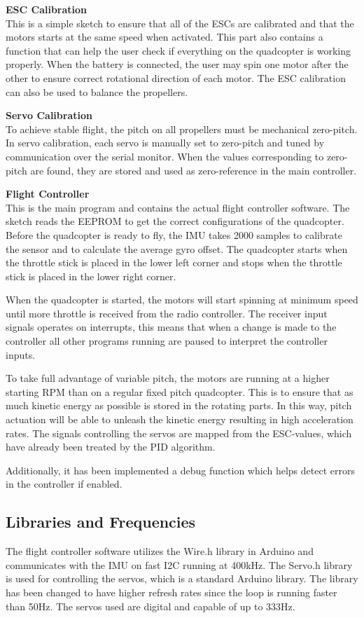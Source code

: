 \textbf{ESC Calibration}\\
This is a simple sketch to ensure that all of the ESCs are calibrated and that the motors starts at the same speed when activated. This part also contains a function that can help the user check if everything on the quadcopter is working properly. When the battery is connected, the user may spin one motor after the other to ensure correct rotational direction of each motor. The ESC calibration can also be used to balance the propellers.  \bigskip

\textbf{Servo Calibration}\\
To achieve stable flight, the pitch on all propellers must be mechanical zero-pitch. In servo calibration, each servo is manually set to zero-pitch and tuned by communication over the serial monitor. When the values corresponding to zero-pitch are found, they are stored and used as zero-reference in the main controller. \bigskip

\textbf{Flight Controller}\\
This is the main program and contains the actual flight controller software. The sketch reads the EEPROM to get the correct configurations of the quadcopter. Before the quadcopter is ready to fly, the IMU takes 2000 samples to calibrate the sensor and to calculate the average gyro offset. The quadcopter starts when the throttle stick is placed in the lower left corner and stops when the throttle stick is placed in the lower right corner. \bigskip

When the quadcopter is started, the motors will start spinning at minimum speed until more throttle is received from the radio controller. The receiver input signals operates on interrupts, this means that when a change is made to the controller all other programs running are paused to interpret the controller inputs.\bigskip

To take full advantage of variable pitch, the motors are running at a higher starting RPM than on a regular fixed pitch quadcopter. This is to ensure that as much kinetic energy as possible is stored in the rotating parts. In this way, pitch actuation will be able to unleash the kinetic energy resulting in high acceleration rates. The signals controlling the servos are mapped from the ESC-values, which have already been treated by the PID algorithm.\bigskip

Additionally, it has been implemented a debug function which helps detect errors in the controller if enabled.

\subsection{Libraries and Frequencies}
The flight controller software utilizes the Wire.h library in Arduino and communicates with the IMU on fast I2C running at 400kHz. The Servo.h library is used for controlling the servos, which is a standard Arduino library. The library has been changed to have higher refresh rates since the loop is running faster than 50Hz. The servos used are digital and capable of up to 333Hz. \bigskip

